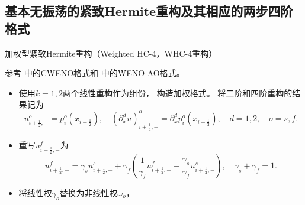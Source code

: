 \documentclass[aspectratio=169]{beamer}
\begin{document}
\subsection[非线性紧致Hermite重构及其相应的两步四阶格式]{基本无振荡的紧致Hermite重构及其相应的两步四阶格式}

\begin{frame}{加权型紧致Hermite重构（Weighted HC-4，WHC-4重构）}
  
  {
    \vspace{-2mm}
    \small
    参考 \citep{CWENO13579} 中的CWENO格式和 \citep{WENOAO} 中的WENO-AO格式。
    \vspace{2mm}
  }
  
  \begin{itemize}[<+->]
    \item 使用$k=1,2$两个线性重构作为组份，
          构造加权格式。
          将二阶和四阶重构的结果记为
          \begin{equation*}
            u_{i+\frac{1}{2},-}^{{o}}= p^{{o}}_{i}(x_{i+\frac{1}{2}}), \quad
            \left({\partial_{x}^{d}}u\right)_{i+\frac{1}{2},-}^{{o}}= {\partial_{x}^{d}}p_{i}^{{o}}(x_{i+\frac{1}{2}}), \quad d=1,2, \quad o=s,f.
          \end{equation*}
          
    \item 重写$u_{i+\frac{1}{2},-}^{{f}}$为
          \begin{equation*}
            u_{i+\frac{1}{2},-}^{{f}}= \gamma_{{s}}u_{i+\frac{1}{2},-}^{{s}}+ \gamma_{{f}}\left(\frac{1}{\gamma_{{f}}}u_{i+\frac{1}{2},-}^{{f}}-\frac{\gamma_{{s}}}{\gamma_{{f}}}u_{i+\frac{1}{2},-}^{{s}}\right), \quad \gamma_{{s}}+ \gamma_{{f}}=1.
          \end{equation*}
          
    \item 将线性权$\gamma_{{o}}$替换为非线性权$\omega_{{o}}$，
  \end{itemize}
  
\end{frame}
\end{document}

